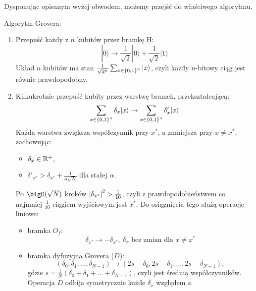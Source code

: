 Dysponując opisanym wyżej obwodem, możemy przejść do właściwego algorytmu.
\begin{greyframe}
    Algorytm Grovera:
    \begin{enumerate}
        \item Przepuść każdy z \( n \) kubitów przez bramkę H:
        \[
            |0\rangle \rightarrow \frac{1}{\sqrt{2}}|0\rangle + \frac{1}{\sqrt{2}}|1\rangle
        \]
        Układ \( n \) kubitów ma stan \( \frac{1}{\sqrt{2^n}} \sum_{x \in \set{0,1}^n} |x\rangle \), czyli każdy \( n \)-bitowy ciąg jest równie prawdopodobny.
        \item Kilkukrotnie przepuść kubity przez warstwę bramek, przekształcającą:
        \[
            \sum_{x \in \set{0,1}^n} \delta_x |x\rangle \rightarrow \sum_{x \in \set{0,1}^n} \delta'_x |x\rangle
        \]
        Każda warstwa zwiększa współczynnik przy \( x^{*} \), a zmniejsza przy \( x \neq x^{*} \), zachowując: 
        \begin{itemize}
            \item \( \delta_x \in \mathbb{R}^{+} \),
            \item \( \delta'_{x^{*}} > \delta_{x^{*}} + \frac{1}{\alpha\sqrt{N}} \) dla stałej \( \alpha \).
        \end{itemize}
        Po \( \bigO(\sqrt{N}) \) kroków \( \left\lvert\delta_{x^{*}}\right\rvert^2 > \frac{1}{10} \), czyli z prawdopodobieństwem co najmniej \( \frac{1}{10} \) ciągiem wyjściowym jest \( x^{*} \).
        Do osiągnięcia tego służą operacje liniowe:
        \begin{itemize}
            \item bramka \( O_f \):
            \[
                \delta_{x^{*}} \rightarrow -\delta_{x^{*}}, \ \delta_{x} \text{ bez zmian dla } x \neq x^{*}
            \]
            \item bramka dyfuzyjna Grovera (\( D \)):
            \[
                (\delta_0, \delta_1, \ldots, \delta_{N-1}) \rightarrow (2s - \delta_0, 2s - \delta_1, \ldots, 2s - \delta_{N-1}),
            \]
            gdzie \( s = \frac{1}{N}(\delta_0 + \delta_1 + \ldots + \delta_{N-1}) \), czyli jest średnią współczynników.
            Operacja \( D \) odbija symetrycznie każde \( \delta_x \) względem \( s \).
        \end{itemize}
    \end{enumerate}
\end{greyframe}

